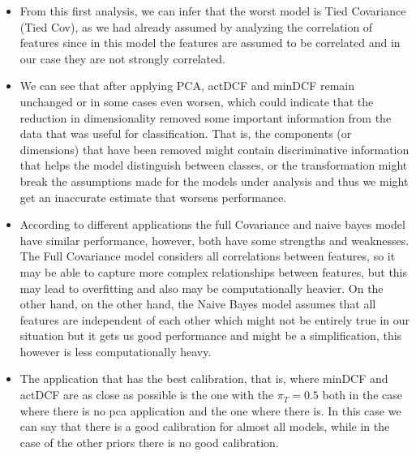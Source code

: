 \documentclass{article}
\begin{document}
\begin{itemize}
    \item From this first analysis, we can infer that the worst model is Tied Covariance (Tied Cov), as we had already assumed by analyzing the correlation of features since in this model the features are assumed to be correlated and in our case they are not strongly correlated.
\item We can see that after applying PCA, actDCF and minDCF remain unchanged or in some cases even worsen, which could indicate that the reduction in dimensionality removed some important information from the data that was useful for classification. That is, the components (or dimensions) that have been removed might contain discriminative information that helps the model distinguish between classes, or the transformation might break the assumptions made for the models under analysis and thus we might get an inaccurate estimate that worsens performance.
\item According to different applications the full Covariance and naive bayes model have similar performance, however, both have some strengths and weaknesses.
The Full Covariance model considers all correlations between features, so it may be able to capture more complex relationships between features, but this may lead to overfitting and also may be computationally heavier. On the other hand, on the other hand, the Naive Bayes model assumes that all features are independent of each other which might not be entirely true in our situation but it gets us good performance and might be a simplification, this however is less computationally heavy.
\item The application that has the best calibration, that is, where minDCF and actDCF are as close as possible is the one with the \(\pi_T=0.5\) both in the case where there is no pca application and the one where there is. In this case we can say that there is a good calibration for almost all models, while in the case of the other priors there is no good calibration.
\end{itemize}
    
\end{document}
